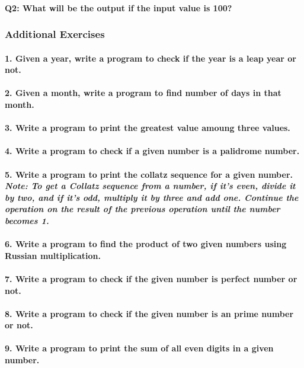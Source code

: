 \documentclass{article}
\begin{document}
\paragraph{Q2: What will be the output if the input value is 100?}

\subsubsection{Additional Exercises}
\paragraph{1. Given a year, write a program to check if the year is a leap year or not.}
\paragraph{2. Given a month, write a program to find number of days in that month.}
\paragraph{3. Write a program to print the greatest value amoung three values.}
\paragraph{4. Write a program to check if a given number is a palidrome number.}
\paragraph{5. Write a program to print the collatz sequence for a given number.\\
\textit{Note: To get a Collatz sequence from a number, if it’s even, divide
it by two, and if it’s odd, multiply it by three and add one. Continue
the operation on the result of the previous operation until the number
becomes 1.}}
\paragraph{6. Write a program to find the product of two given numbers using Russian multiplication.}
\paragraph{7. Write a program to check if the given number is perfect number or not.}
\paragraph{8. Write a program to check if the given number is an prime number or not.}
\paragraph{9. Write a program to print the sum of all even digits in a given number.}
\end{document}
